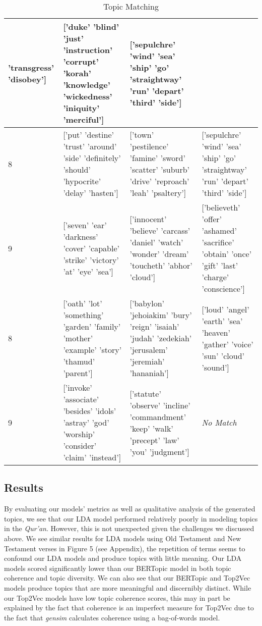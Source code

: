 \documentclass{article}
\begin{document}
\begin{table}[H]
\begin{tabular}{|p{1cm}|p{4cm}|p{4cm}|p{4cm}|}
         'transgress' 'disobey'] & ['duke' 'blind' 'just' 'instruction' 'corrupt' 'korah' 'knowledge' 'wickedness' 'iniquity' 'merciful'] & ['sepulchre' 'wind' 'sea' 'ship' 'go' 'straightway' 'run' 'depart' 'third' 'side'] \\
         \hline
        8 & ['put' 'destine' 'trust' 'around' 'side' 'definitely' 'should' 'hypocrite' 'delay' 'hasten'] & ['town' 'pestilence' 'famine' 'sword' 'scatter' 'suburb' 'drive' 'reproach' 'leah' 'psaltery'] & ['sepulchre' 'wind' 'sea' 'ship' 'go' 'straightway' 'run' 'depart' 'third' 'side'] \\
         \hline
        9 & ['seven' 'ear' 'darkness' 'cover' 'capable' 'strike' 'victory' 'at' 'eye' 'sea'] & ['innocent' 'believe' 'carcass' 'daniel' 'watch' 'wonder' 'dream'
         'toucheth' 'abhor' 'cloud'] & ['believeth' 'offer' 'ashamed' 'sacrifice' 'obtain' 'once' 'gift' 'last' 'charge' 'conscience'] \\
         \hline
        8 & ['oath' 'lot' 'something' 'garden' 'family' 'mother' 'example' 'story'
         'thamud' 'parent'] & ['babylon' 'jehoiakim' 'bury' 'reign' 'isaiah' 'judah' 'zedekiah' 'jerusalem' 'jeremiah' 'hananiah'] & ['loud' 'angel' 'earth' 'sea' 'heaven' 'gather' 'voice' 'sun' 'cloud' 'sound'] \\
         \hline
        9 & ['invoke' 'associate' 'besides' 'idols' 'astray' 'god' 'worship'
         'consider' 'claim' 'instead'] & ['statute' 'observe' 'incline' 'commandment' 'keep' 'walk' 'precept' 'law'
         'you' 'judgment'] & \textit{No Match} \\
         \hline
        \bottomrule
        \end{tabular}
        \caption{Topic Matching}
        \label{tab:my_label}
    \end{table}
    

\subsection{Results}

By evaluating our models' metrics as well as qualitative analysis of the generated topics, we see that our LDA model performed relatively poorly in modeling topics in the \textit{Qur'an}. However, this is not unexpected given the challenges we discussed above. We see similar results for LDA models using Old Testament and New Testament verses in Figure 5 (see Appendix), the repetition of terms seems to confound our LDA models and produce topics with little meaning. Our LDA models scored significantly lower than our BERTopic model in both topic coherence and topic diversity. We can also see that our BERTopic and Top2Vec models produce topics that are more meaningful and discernibly distinct. While our Top2Vec models have low topic coherence scores, this may in part be explained by the fact that coherence is an imperfect measure for Top2Vec due to the fact that \textit{gensim} calculates coherence using a bag-of-words model. 
\end{document}

